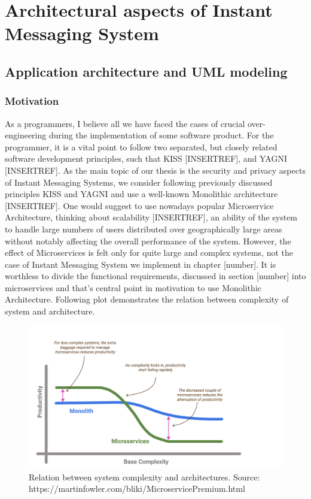 \chapter{Architectural aspects of Instant Messaging System}\label{ch:secure-ims-implementation}


\section{Application architecture and UML modeling}\label{sec:application-architecture-and-uml-modeling}

\subsection{Motivation}\label{subsec:motivation}
As a programmers, I believe all we have faced the cases of crucial over-engineering during the implementation of some software product.
For the programmer, it is a vital point to follow two separated, but closely related software development principles, such that
KISS [INSERTREF], and YAGNI [INSERTREF].
As the main topic of our thesis is the security and privacy aspects of Instant Messaging Systems, we consider following
previously discussed principles KISS and YAGNI and use a well-known Monolithic architecture [INSERTREF].
One would suggest to use nowadays popular Microservice Architecture, thinking about scalability [INSERTREF],
an ability of the system to handle large numbers of users distributed over geographically large areas without notably affecting
the overall performance of the system.
However, the effect of Microservices is felt only for quite large and complex systems, not the case of Instant Messaging System
we implement in chapter [number].
It is worthless to divide the functional requirements, discussed in section [number] into microservices and that's central point
in motivation to use Monolithic Architecture.
Following plot demonstrates the relation between complexity of system and architecture.

\begin{figure}[H]
    \centering
    \includegraphics[width=1\textwidth]{Pictures/Monolith_vs_Microservice.pdf}
    \caption{Relation between system complexity and architectures. Source: https://martinfowler.com/bliki/MicroservicePremium.html}
    \label{fig:monolith_vs_microservice}
\end{figure}

